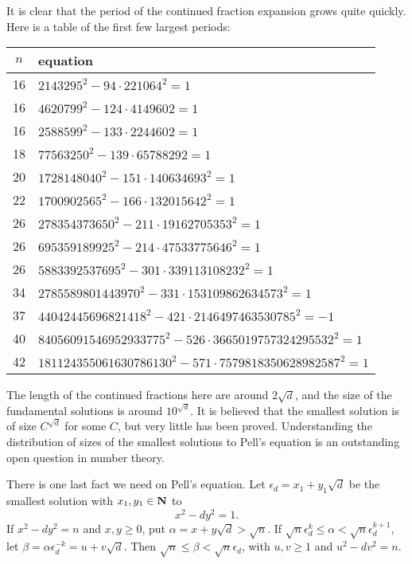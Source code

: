 It is clear that the period of the continued fraction expansion grows quite 
quickly. Here is a table of the first few largest periods:
\begin{center}
\begin{tabular}{c|l}
$n$ & equation \\ \hline
16 & $2143295^2 - 94\cdot 221064^2 = 1$ \\
16 & $4620799^2 - 124\cdot 414960 2 = 1$ \\
16 & $2588599^2 - 133\cdot 224460 2 = 1$ \\
18 & $77563250^2 - 139\cdot 6578829 2 = 1$ \\
20 & $1728148040^2 - 151\cdot 140634693^2 = 1$ \\
22 & $1700902565^2 - 166\cdot 132015642^2 = 1$ \\
26 & $278354373650^2 - 211\cdot 19162705353^2 = 1$ \\
26 & $695359189925^2 - 214\cdot 47533775646^2 = 1$ \\
26 & $5883392537695^2 - 301\cdot 339113108232^2 = 1$ \\
34 & $2785589801443970^2 - 331\cdot 153109862634573^2 = 1$ \\
37 & $44042445696821418^2 - 421\cdot 2146497463530785^2 = -1$ \\
40 & $84056091546952933775^2 - 526\cdot 3665019757324295532^2 = 1$ \\
42 & $181124355061630786130^2 - 571\cdot 7579818350628982587^2 = 1$
\end{tabular}
\end{center}
The length of the continued fractions here are around $2\sqrt d$, and the 
size of the fundamental solutions is around $10^{\sqrt d}$. It is believed that 
the smallest solution is of size $C^{\sqrt d}$ for some $C$, but very little 
has been proved. Understanding the distribution of sizes of the smallest 
solutions to Pell's equation is an outstanding open question in number theory. 

There is one last fact we need on Pell's equation. Let 
$\epsilon_d=x_1+y_1\sqrt d$ be the smallest solution with $x_1,y_1\in \mathbf{N}$ to 
\[
  x^2 - d y^2 = 1 .
\]
If $x^2 - d y^2=n$ and $x,y\geqslant 0$, put 
$\alpha = x+y\sqrt d>\sqrt n$. If 
$\sqrt n\epsilon_d^k \leqslant \alpha < \sqrt n \epsilon_d^{k+1}$, let 
$\beta=\alpha \epsilon_d^{-k} = u+v\sqrt d$. Then 
$\sqrt n\leqslant \beta < \sqrt n\epsilon_d$, with $u,v\geqslant 1$ and 
$u^2 - d v^2 = n$. 





